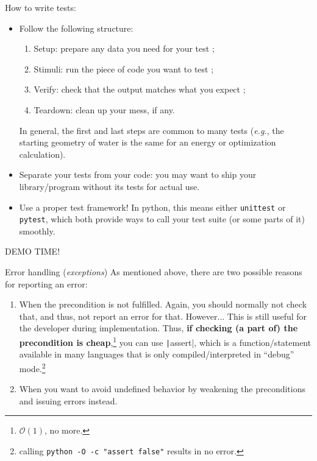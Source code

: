\documentclass[10pt,
aspectratio=169
]{beamer}
\begin{document}
\begin{frame}
	How to write tests:\begin{itemize}
		\item Follow the following structure:\begin{enumerate}
			\item Setup: prepare any data you need for your test ;
			\item Stimuli: run the piece of code you want to test ;
			\item Verify: check that the output matches what you expect ;
			\item Teardown: clean up your mess, if any.
		\end{enumerate}
		In general, the first and last steps are common to many tests (\textit{e.g.}, the starting geometry of water is the same for an energy or optimization calculation).
		\item Separate your tests from your code: you may want to ship your library/program without its tests for actual use.
		\item Use a proper test framework! In python, this means either \texttt{unittest} or \texttt{pytest}, which both provide ways to call your test suite (or some parts of it) smoothly.
	\end{itemize}
\end{frame}

\begin{frame}
\begin{center}
	{\LARGE DEMO TIME!}
\end{center}
\end{frame}

\begin{frame}{Error handling (\textit{exceptions})}
	As mentioned above, there are two possible reasons for reporting an error:\begin{enumerate}
		\item When the precondition is not fulfilled. Again, you should normally not check that, and thus, not report an error for that. However... This is still useful for the developer during implementation. Thus, \textbf{if checking (a part of) the precondition is cheap},\footnote{$\mathcal{O}(1)$, no more.} you can use \texttt|assert|, which is a function/statement available in many languages that is only compiled/interpreted in ``debug'' mode.\footnote{calling \texttt{python -O -c "assert false"} results in no error.}
		\item When you want to avoid undefined behavior by weakening the preconditions and issuing errors instead.
	\end{enumerate}
\end{frame}
\end{document}
